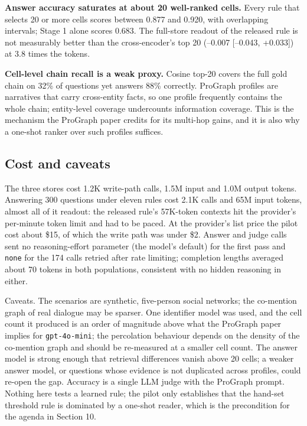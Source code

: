 \documentclass[11pt]{article}
\begin{document}
\textbf{Answer accuracy saturates at about 20 well-ranked cells.} Every rule that selects 20 or more cells scores between 0.877 and 0.920, with overlapping intervals; Stage 1 alone scores 0.683. The full-store readout of the released rule is not measurably better than the cross-encoder's top 20 (--0.007 [--0.043, +0.033]) at 3.8 times the tokens.

\textbf{Cell-level chain recall is a weak proxy.} Cosine top-20 covers the full gold chain on 32\% of questions yet answers 88\% correctly. ProGraph profiles are narratives that carry cross-entity facts, so one profile frequently contains the whole chain; entity-level coverage undercounts information coverage. This is the mechanism the ProGraph paper credits for its multi-hop gains, and it is also why a one-shot ranker over such profiles suffices.

\subsection{Cost and caveats}

The three stores cost 1.2K write-path calls, 1.5M input and 1.0M output tokens. Answering 300 questions under eleven rules cost 2.1K calls and 65M input tokens, almost all of it readout: the released rule's 57K-token contexts hit the provider's per-minute token limit and had to be paced. At the provider's list price the pilot cost about \$15, of which the write path was under \$2. Answer and judge calls sent no reasoning-effort parameter (the model's default) for the first pass and \texttt{none} for the 174 calls retried after rate limiting; completion lengths averaged about 70 tokens in both populations, consistent with no hidden reasoning in either.

Caveats. The scenarios are synthetic, five-person social networks; the co-mention graph of real dialogue may be sparser. One identifier model was used, and the cell count it produced is an order of magnitude above what the ProGraph paper implies for \texttt{gpt-4o-mini}; the percolation behaviour depends on the density of the co-mention graph and should be re-measured at a smaller cell count. The answer model is strong enough that retrieval differences vanish above 20 cells; a weaker answer model, or questions whose evidence is not duplicated across profiles, could re-open the gap. Accuracy is a single LLM judge with the ProGraph prompt. Nothing here tests a learned rule; the pilot only establishes that the hand-set threshold rule is dominated by a one-shot reader, which is the precondition for the agenda in Section 10.
\end{document}
